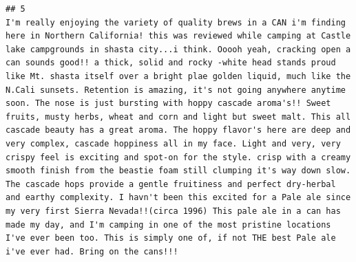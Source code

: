 \documentclass[
  a4paper,
]{article}
\begin{document}
\begin{verbatim}
## 5                                                                                                                                                                                                                                                                                                                                                                                                                                                                                                                                                                                                                                                                                                                                                                                                                                                                                   I'm really enjoying the variety of quality brews in a CAN i'm finding here in Northern California! this was reviewed while camping at Castle lake campgrounds in shasta city...i think. Ooooh yeah, cracking open a can sounds good!! a thick, solid and rocky -white head stands proud like Mt. shasta itself over a bright plae golden liquid, much like the N.Cali sunsets. Retention is amazing, it's not going anywhere anytime soon. The nose is just bursting with hoppy cascade aroma's!! Sweet fruits, musty herbs, wheat and corn and light but sweet malt. This all cascade beauty has a great aroma. The hoppy flavor's here are deep and very complex, cascade hoppiness all in my face. Light and very, very crispy feel is exciting and spot-on for the style. crisp with a creamy smooth finish from the beastie foam still clumping it's way down slow. The cascade hops provide a gentle fruitiness and perfect dry-herbal and earthy complexity. I havn't been this excited for a Pale ale since my very first Sierra Nevada!!(circa 1996) This pale ale in a can has made my day, and I'm camping in one of the most pristine locations I've ever been too. This is simply one of, if not THE best Pale ale i've ever had. Bring on the cans!!!

\end{verbatim}
\end{document}
